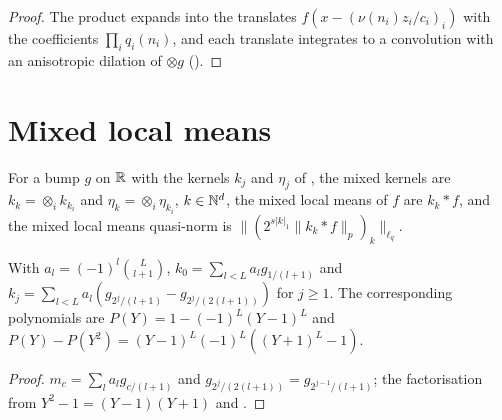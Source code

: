 \begin{proof}
\leanok
The product expands into the translates $f(x - (\nu(n_i) z_i / c_i)_i)$ with the coefficients
$\prod_i q_i(n_i)$, and each translate integrates to a convolution with an anisotropic dilation
of $\otimes g$ ().
\end{proof}

\section{Mixed local means}

\begin{definition}
\label{def:mixed-local-means}
\leanok
{}
For a bump $g$ on $\mathbb{R}$ with the kernels $k_j$ and $\eta_j$ of , the mixed
kernels are $k_k = \otimes_i k_{k_i}$ and $\eta_k = \otimes_i \eta_{k_i}$, $k \in \mathbb{N}^d$, the mixed
local means of $f$ are $k_k * f$, and the mixed local means quasi-norm is
$\|(2^{s|k|_1} \|k_k * f\|_p)_k\|_{\ell_q}$.
\end{definition}

\begin{lemma}
\label{lem:kernel-dilation-sum}
\leanok
{}
With $a_l = (-1)^l \binom{L}{l+1}$, $k_0 = \sum_{l < L} a_l g_{1/(l+1)}$ and
$k_j = \sum_{l < L} a_l (g_{2^j/(l+1)} - g_{2^j/(2(l+1))})$ for $j \geq 1$. The corresponding
polynomials are $P(Y) = 1 - (-1)^L (Y - 1)^L$ and
$P(Y) - P(Y^2) = (Y - 1)^L (-1)^L ((Y + 1)^L - 1)$.
\end{lemma}

\begin{proof}
\leanok
$m_c = \sum_l a_l g_{c/(l+1)}$ and $g_{2^j/(2(l+1))} = g_{2^{j-1}/(l+1)}$; the factorisation from
$Y^2 - 1 = (Y - 1)(Y + 1)$ and .
\end{proof}

